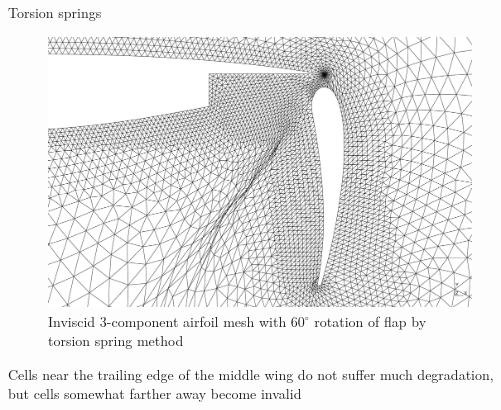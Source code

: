 \documentclass[t,12pt]{beamer}
\begin{document}
\begin{frame}{Torsion springs}
	\begin{figure}[!h]
		\centering
		\includegraphics[scale=0.17]{wing60-farhat}
		\caption{Inviscid 3-component airfoil mesh with 60$^\circ$ rotation of flap by torsion spring method}
		\label{fig:wing-inviscid-farhat}
	\end{figure}
	Cells near the trailing edge of the middle wing do not suffer much degradation, but cells somewhat farther away become invalid
\end{frame}
\end{document}
